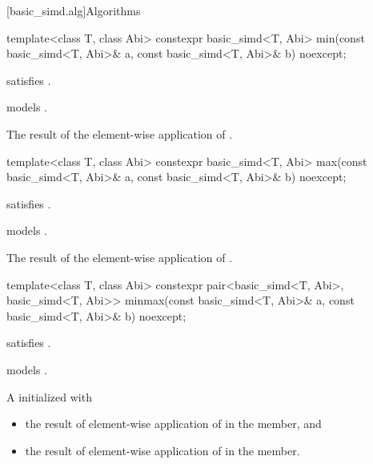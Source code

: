 [basic_simd.alg]{Algorithms}

\begin{itemdecl}
template<class T, class Abi> constexpr basic_simd<T, Abi> min(const basic_simd<T, Abi>& a, const basic_simd<T, Abi>& b) noexcept;
\end{itemdecl}

\begin{itemdescr}
  \pnum\constraints
   satisfies .

  \pnum\expects
   models .

  \pnum\returns
  The result of the element-wise application of  \foralli.
\end{itemdescr}

\begin{itemdecl}
template<class T, class Abi> constexpr basic_simd<T, Abi> max(const basic_simd<T, Abi>& a, const basic_simd<T, Abi>& b) noexcept;
\end{itemdecl}

\begin{itemdescr}
  \pnum\constraints
   satisfies .

  \pnum\expects
   models .

  \pnum\returns
  The result of the element-wise application of  \foralli.
\end{itemdescr}

\begin{itemdecl}
template<class T, class Abi>
  constexpr pair<basic_simd<T, Abi>, basic_simd<T, Abi>> minmax(const basic_simd<T, Abi>& a, const basic_simd<T, Abi>& b) noexcept;
\end{itemdecl}

\begin{itemdescr}
  \pnum\constraints
   satisfies .

  \pnum\expects
   models .

  \pnum\returns
  A  initialized with
  \begin{itemize}
    \item the result of element-wise application of  \foralli{} in the  member, and
    \item the result of element-wise application of  \foralli{} in the  member.
  \end{itemize}
\end{itemdescr}

